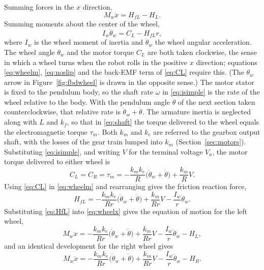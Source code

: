 Summing forces in the $x$ direction,
\begin{equation}\label{eq:wheelx}
M_w\ddot x=H_{fL}-H_L .
\end{equation}
Summing moments about the center of the wheel,
\begin{equation}\label{eq:wheelm}
I_w\ddot\theta_w=C_L-H_{fL}r ,
\end{equation}
where $I_w$ is the wheel moment of inertia and $\ddot\theta_w$ the wheel angular
acceleration. The wheel angle $\theta_w$ and the motor torque $C_L$ are both taken
clockwise, the sense in which a wheel turns when the robot rolls in the positive $x$
direction; equations \eqref{eq:wheelm}, \eqref{eq:noslip} and the back-EMF term of
\eqref{eq:CL} require this. (The $\theta_w$ arrow in Figure~\ref{fig:fbdwheel} is
drawn in the opposite sense.) The motor stator is fixed to the pendulum body, so
the shaft rate $\omega$ in \eqref{eq:isimple} is the rate of the wheel relative to
the body. With the pendulum angle $\theta$ of the next section taken
counterclockwise, that relative rate is $\dot\theta_w+\dot\theta$. The armature
inertia is neglected along with $L$ and $k_f$, so that in \eqref{eq:shaft} the
torque delivered to the wheel equals the electromagnetic torque $\tau_m$. Both
$k_m$ and $k_e$ are referred to the gearbox output shaft, with the losses of
the gear train lumped into $k_m$ (Section~\ref{sec:motors}).
Substituting \eqref{eq:isimple}, and writing $V$ for the terminal voltage $V_a$,
the motor torque delivered to either wheel is
\begin{equation}\label{eq:CL}
C_L=C_R=\tau_m=-\frac{k_mk_e}{R}\bigl(\dot\theta_w+\dot\theta\bigr)+\frac{k_m}{R}V .
\end{equation}
Using \eqref{eq:CL} in \eqref{eq:wheelm} and rearranging gives the friction
reaction force,
\begin{equation}\label{eq:HfL}
H_{fL}=-\frac{k_mk_e}{Rr}\bigl(\dot\theta_w+\dot\theta\bigr)+\frac{k_m}{Rr}V
-\frac{I_w}{r}\ddot\theta_w .
\end{equation}
Substituting \eqref{eq:HfL} into \eqref{eq:wheelx} gives the equation of motion
for the left wheel,
\begin{equation}\label{eq:wheelL}
M_w\ddot x=-\frac{k_mk_e}{Rr}\bigl(\dot\theta_w+\dot\theta\bigr)+\frac{k_m}{Rr}V
-\frac{I_w}{r}\ddot\theta_w-H_L ,
\end{equation}
and an identical development for the right wheel gives
\begin{equation}\label{eq:wheelR}
M_w\ddot x=-\frac{k_mk_e}{Rr}\bigl(\dot\theta_w+\dot\theta\bigr)+\frac{k_m}{Rr}V
-\frac{I_w}{r}\ddot\theta_w-H_R .
\end{equation}

